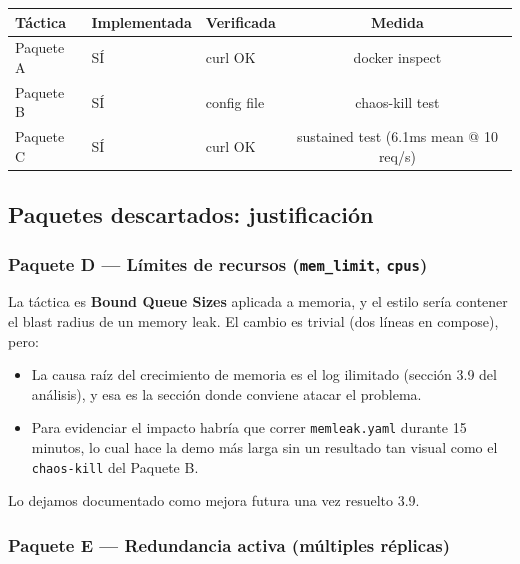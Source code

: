 \begin{table}[H]
\centering
\begin{tabular}{lllc}
\toprule
\textbf{Táctica} & \textbf{Implementada} & \textbf{Verificada} & \textbf{Medida} \\
\midrule
Paquete A & SÍ & curl OK & docker inspect \\
Paquete B & SÍ & config file & chaos-kill test \\
Paquete C & SÍ & curl OK & sustained test (6.1ms mean @ 10 req/s) \\
\bottomrule
\end{tabular}
\end{table}\subsection{Paquetes descartados: justificación}

\subsubsection{Paquete D — Límites de recursos (\texttt{mem\_limit}, \texttt{cpus})}

La táctica es \textbf{Bound Queue Sizes} aplicada a memoria, y el estilo sería contener el blast radius de un memory leak. El cambio es trivial (dos líneas en compose), pero:
\begin{itemize}
    \item La causa raíz del crecimiento de memoria es el log ilimitado (sección 3.9 del análisis), y esa es la sección donde conviene atacar el problema.
    \item Para evidenciar el impacto habría que correr \texttt{memleak.yaml} durante 15 minutos, lo cual hace la demo más larga sin un resultado tan visual como el \texttt{chaos-kill} del Paquete B.
\end{itemize}
Lo dejamos documentado como mejora futura una vez resuelto 3.9.

\subsubsection{Paquete E — Redundancia activa (múltiples réplicas)}

